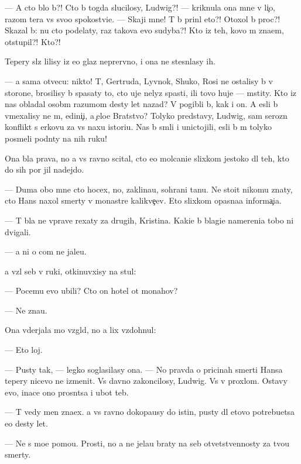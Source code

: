 \documentclass[10pt]{book}
\begin{document}
— A cto b{\yi}lo b{\yi}?! Cto b{\yi} togda slucilosy, Ludwig?! — kriknula ona mne v li{\c}o, razom ter{\ia}{\y}a vs{\e} svo{\y}o spoko{\y}stvi{\y}e. — Skaji mne! T{\yi} b{\yi} prin{\ia}l eto?! Otoxol b{\yi} proc?! Skazal b{\yi}: nu cto podelaty, raz takova {\y}evo sudyba?! Kto iz teh, kovo m{\yi} zna{\y}em, otstupil?! Kto?!

Tepery sl{\e}z{\yi} lilisy iz {\y}e{\y}o glaz neprer{\yi}vno, i ona ne stesn{\ia}lasy ih.

— {\Y}a sama otvecu: nikto! T{\yi}, Gertruda, Lyv{\e}nok, Shuko, Rosi ne ostalisy b{\yi} v storone, brosilisy b{\yi} spasaty to, cto uje nelyz{\ia} spasti, ili tovo huje — mstity. Kto iz nas obladal osob{\yi}m razumom des{\ia}ty let nazad? V{\yi} pogibli b{\yi}, kak i on. A {\y}esli b{\yi} vmexalisy ne m{\yi}, {\y}edini{\c}i, a {\c}elo{\y}e Bratstvo? Tolyko predstavy, Ludwig, sam{\yi}{\y} ser{\y}ozn{\yi}{\y} konflikt s {\C}erkov{\y}u za vs{\iu} naxu istori{\y}u. Nas b{\yi} sm{\ia}li i unictojili, {\y}esli b{\yi} m{\yi} tolyko posmeli podn{\ia}ty na nih ruku!

Ona b{\yi}la prava, no {\y}a vs{\e} ravno scital, cto {\y}e{\y}o molcani{\y}e slixkom jestoko dl{\ia} teh, kto do sih por jil nadejdo{\y}.

— Duma{\y} obo mne cto hocex, no, zaklina{\y}u, sohrani ta{\y}nu. Ne sto{\y}it nikomu znaty, cto Hans naxol smerty v monast{\yi}re kalikve{\c}ev. Eto slixkom opasna{\y}a informa{\c}i{\y}a.

— T{\yi} b{\yi}la ne vprave rexaty za drugih, Kristina. Kaki{\y}e b{\yi} blagi{\y}e namereni{\y}a tobo{\y} ni dvigali.

— {\Y}a ni o com ne jale{\y}u.

{\Y}a vz{\ia}l seb{\ia} v ruki, otkinuvxisy na stul:

— Pocemu {\y}evo ubili? Cto on hotel ot monahov?

— Ne zna{\y}u.

Ona v{\yi}derjala mo{\y} vzgl{\ia}d, no {\y}a lix vzdohnul:

— Eto loj.

— Pusty tak, — legko soglasilasy ona. — No pravda o pricinah smerti Hansa tepery nicevo ne izmenit. Vs{\e} davno zakoncilosy, Ludwig. Vs{\e} v proxlom. Ostavy {\y}evo, inace ono prosn{\e}tsa i ub{\y}ot teb{\ia}.

— T{\yi} vedy men{\ia} zna{\y}ex. {\Y}a vs{\e} ravno dokopa{\y}usy do istin{\yi}, pusty dl{\ia} etovo potrebu{\y}etsa {\y}e{\x}o des{\ia}ty let.

— Ne s mo{\y}e{\y} pomo{\x}{\y}u. Prosti, no {\y}a ne jela{\y}u braty na seb{\ia} otvetstvennosty za tvo{\y}u smerty.
\end{document}
